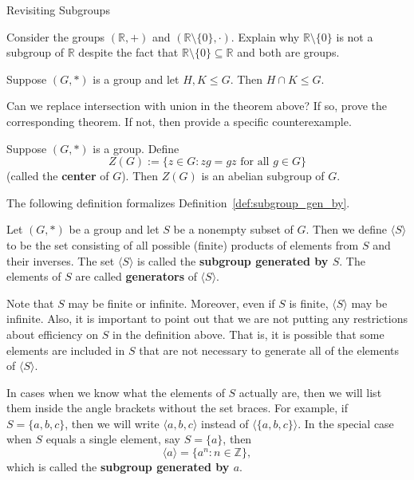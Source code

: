 \begin{section}{Revisiting Subgroups}
\begin{exercise}
Consider the groups \((\mathbb{R},+)\) and \((\mathbb{R}\setminus\{0\},\cdot)\).  Explain why \(\mathbb{R}\setminus\{0\}\) is not a subgroup of \(\mathbb{R}\) despite the fact that \(\mathbb{R}\setminus\{0\}\subseteq\mathbb{R}\) and both are groups.
\end{exercise}

\begin{theorem}
Suppose \((G,*)\) is a group and let \(H,K\leq G\).  Then \(H\cap K\leq G\).
\end{theorem}

\begin{problem}
Can we replace intersection with union in the theorem above?  If so, prove the corresponding theorem.  If not, then provide a specific counterexample.
\end{problem}

\begin{theorem}
Suppose \((G,*)\) is a group.  Define
\[
Z(G):=\{z\in G:zg=gz\text{ for all } g\in G\}
\]
(called the \textbf{center} of \(G\)).  Then \(Z(G)\) is an abelian subgroup of \(G\).
\end{theorem}

The following definition formalizes Definition~\ref{def:subgroup_gen_by}.

\begin{definition}
Let \((G,*)\) be a group and let \(S\) be a nonempty subset of \(G\).  Then we define \(\langle S\rangle\) to be the set consisting of all possible (finite) products of elements from \(S\) and their inverses.  The set \(\langle S\rangle\) is called the \textbf{subgroup generated by \(S\)}.  The elements of \(S\) are called \textbf{generators} of \(\langle S\rangle\).
\end{definition}

Note that \(S\) may be finite or infinite.  Moreover, even if \(S\) is finite, \(\langle S\rangle\) may be infinite.  Also, it is important to point out that we are not putting any restrictions about efficiency on \(S\) in the definition above.  That is, it is possible that some elements are included in \(S\) that are not necessary to generate all of the elements of \(\langle S\rangle\).

In cases when we know what the elements of \(S\) actually are, then we will list them inside the angle brackets without the set braces.  For example, if \(S=\{a,b,c\}\), then we will write \(\langle a, b, c\rangle\) instead of \(\langle \{a,b,c\}\rangle\).  In the special case when \(S\) equals a single element, say \(S=\{a\}\), then
\[
\langle a\rangle =\{a^n:n\in\mathbb{Z}\},
\]
which is called the \textbf{subgroup generated by \(a\)}.  


\end{section}
